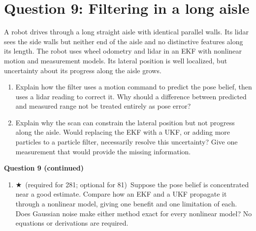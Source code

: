 \documentclass[11pt]{article}
\newcommand{\gradstar}{$\bigstar$~\textsf{\small (required for 281; optional for 81)}~}
\newenvironment{studentanswer}[1]
  {\par\medskip\noindent
   \begin{tcolorbox}[height from=#1 to 100cm, colback=white, colframe=gray!60,
     boxrule=0.6pt, arc=0pt, outer arc=0pt, left=7pt, right=7pt,
     top=7pt, bottom=7pt, title={Answer / work}, fonttitle=\small,
     coltitle=black, colbacktitle=gray!8, titlerule=0pt]
   \ignorespaces}
  {\end{tcolorbox}\par}
\begin{document}
\clearpage
\section*{Question 9: Filtering in a long aisle}
A robot drives through a long straight aisle with identical parallel
walls. Its lidar sees the side walls but neither end of the aisle and
no distinctive features along its length. The robot uses wheel odometry
and lidar in an EKF with nonlinear motion and measurement models.
Its lateral position is well localized, but uncertainty about its progress
along the aisle grows.
\begin{enumerate}[label=(\alph*)]
\item \begin{minipage}[t]{\linewidth} Explain how the filter uses a motion command to predict the
pose belief, then uses a lidar reading to correct it. Why should a
difference between predicted and measured range not be treated entirely
as pose error?

\begin{studentanswer}{4cm}
\end{studentanswer}

\end{minipage}
\item \begin{minipage}[t]{\linewidth} Explain why the scan can constrain the lateral position but
not progress along the aisle. Would replacing the EKF with a UKF, or
adding more particles to a particle filter, necessarily resolve this
uncertainty? Give one measurement that would provide the missing information.

\begin{studentanswer}{5cm}
\end{studentanswer}

\end{minipage}
\end{enumerate}
\clearpage
\noindent\textbf{Question 9 (continued)}
\begin{enumerate}[label=(\alph*),start=3]
\item \begin{minipage}[t]{\linewidth} \gradstar Suppose the pose belief is concentrated near a good
estimate. Compare how an EKF and a UKF propagate it through a nonlinear
model, giving one benefit and one limitation of each. Does Gaussian
noise make either method exact for every nonlinear model?
No equations or derivations are required.

\begin{studentanswer}{5cm}
\end{studentanswer}

\end{minipage}
\end{enumerate}
\end{document}
